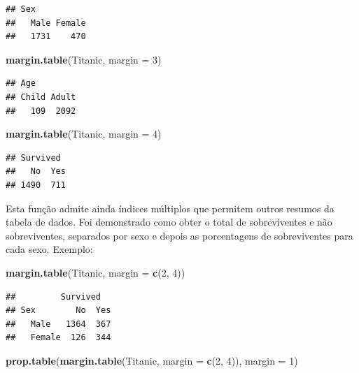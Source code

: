 \documentclass[
]{book}
\newenvironment{Shaded}{\begin{snugshade}}{\end{snugshade}}
\newcommand{\DataTypeTok}[1]{\textcolor[rgb]{0.13,0.29,0.53}{#1}}
\newcommand{\DecValTok}[1]{\textcolor[rgb]{0.00,0.00,0.81}{#1}}
\newcommand{\KeywordTok}[1]{\textcolor[rgb]{0.13,0.29,0.53}{\textbf{#1}}}
\newcommand{\NormalTok}[1]{#1}
\begin{document}
\begin{verbatim}
## Sex
##   Male Female 
##   1731    470
\end{verbatim}

\begin{Shaded}
\begin{Highlighting}[]
\KeywordTok{margin.table}\NormalTok{(Titanic, }\DataTypeTok{margin =} \DecValTok{3}\NormalTok{)}
\end{Highlighting}
\end{Shaded}

\begin{verbatim}
## Age
## Child Adult 
##   109  2092
\end{verbatim}

\begin{Shaded}
\begin{Highlighting}[]
\KeywordTok{margin.table}\NormalTok{(Titanic, }\DataTypeTok{margin =} \DecValTok{4}\NormalTok{)}
\end{Highlighting}
\end{Shaded}

\begin{verbatim}
## Survived
##   No  Yes 
## 1490  711
\end{verbatim}

Esta função admite ainda índices múltiplos que permitem outros resumos da tabela de dados. Foi demonstrado como obter o total de sobreviventes e não sobreviventes, separados por sexo e depois as porcentagens de sobreviventes para cada sexo. Exemplo:

\begin{Shaded}
\begin{Highlighting}[]
\KeywordTok{margin.table}\NormalTok{(Titanic, }\DataTypeTok{margin =} \KeywordTok{c}\NormalTok{(}\DecValTok{2}\NormalTok{, }\DecValTok{4}\NormalTok{))}
\end{Highlighting}
\end{Shaded}

\begin{verbatim}
##         Survived
## Sex        No  Yes
##   Male   1364  367
##   Female  126  344
\end{verbatim}

\begin{Shaded}
\begin{Highlighting}[]
\KeywordTok{prop.table}\NormalTok{(}\KeywordTok{margin.table}\NormalTok{(Titanic, }\DataTypeTok{margin =} \KeywordTok{c}\NormalTok{(}\DecValTok{2}\NormalTok{, }\DecValTok{4}\NormalTok{)), }\DataTypeTok{margin =} \DecValTok{1}\NormalTok{)}
\end{Highlighting}
\end{Shaded}
\end{document}
